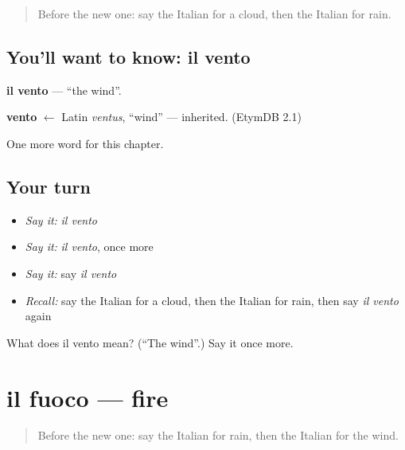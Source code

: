 \label{lesson:IT-C67-vento}



\begin{quote}
Before the new one: say the Italian for a cloud, then the Italian for rain.
\end{quote}

\subsection*{You'll want to know: il vento}
\textbf{il vento} — \textquotedblleft{}the wind\textquotedblright{}.

\begin{cousinweb}
\textbf{vento} $\leftarrow$ Latin \emph{ventus}, \textquotedblleft{}wind\textquotedblright{} — inherited. (EtymDB 2.1)
\end{cousinweb}

\begin{grammarlens}[title={What you've built}]
One more word for this chapter.
\end{grammarlens}

\subsection*{Your turn}
\begin{itemize}
\raggedright
  \item \emph{Say it:} \emph{il vento}
  \item \emph{Say it:} \emph{il vento}, once more
  \item \emph{Say it:} say \emph{il vento}
  \item \emph{Recall:} say the Italian for a cloud, then the Italian for rain, then say \emph{il vento} again
\end{itemize}

\begin{tcolorbox}[breakable,colback=teal!4,colframe=teal!35!black,title={Before you move on}]
What does il vento mean? (\textquotedblleft{}The wind\textquotedblright{}.) Say it once more.
\end{tcolorbox}
\section[il fuoco]{il fuoco — fire}

\label{lesson:IT-C67-fuoco}



\begin{quote}
Before the new one: say the Italian for rain, then the Italian for the wind.
\end{quote}


